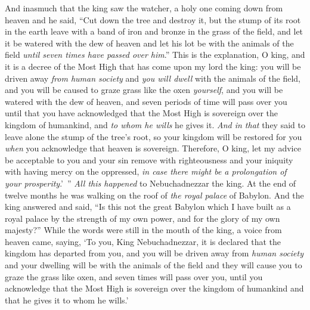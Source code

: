 \begin{biblechapter}
\verse And inasmuch that the king saw the watcher, a holy one coming down from heaven and he said, “Cut down the tree and destroy it, but the stump of its root in the earth leave with a band of iron and bronze in the grass of the field, and let it be watered with the dew of heaven and let his lot be with the animals of the field \textit{until seven times have passed over him}.”
\verse This is the explanation, O king, and it is a decree of the Most High that has come upon my lord the king:
\verse you will be driven away \textit{from human society} and \textit{you will dwell} with the animals of the field, and you will be caused to graze grass like the oxen \textit{yourself}, and you will be watered with the dew of heaven, and seven periods of time will pass over you until that you have acknowledged that the Most High is sovereign over the kingdom of humankind, and \textit{to whom he wills} he gives it.
\verse \textit{And in that} they said to leave alone the stump of the tree’s root, so your kingdom will be restored for you \textit{when} you acknowledge that heaven is sovereign.
\verse Therefore, O king, let my advice be acceptable to you and your sin remove with righteousness and your iniquity with having mercy on the oppressed, \textit{in case there might be a prolongation of your prosperity}.’ ”
 \textit{All this happened} to Nebuchadnezzar the king.
\verse At the end of twelve months he was walking on the roof of \textit{the royal palace} of Babylon.
\verse And the king answered and said, “Is this not the great Babylon which I have built as a royal palace by the strength of my own power, and for the glory of my own majesty?”
\verse While the words were still in the mouth of the king, a voice from heaven came, saying, ‘To you, King Nebuchadnezzar, it is declared that the kingdom has departed from you,
\verse and you will be driven away from \textit{human society} and your dwelling will be with the animals of the field and they will cause you to graze the grass like oxen, and seven times will pass over you, until you acknowledge that the Most High is sovereign over the kingdom of humankind and that he gives it to whom he wills.’

\end{biblechapter}
